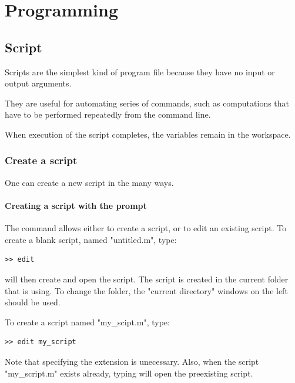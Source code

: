 \chapter{Programming}
\label{chap-code}

\section{Script}\label{sec-script}
	Scripts are the simplest kind of program file because they have no input or output arguments. 

	They are useful for automating series of \matlab commands, such as computations that have to be performed repeatedly from the command line.


	When execution of the script completes, the variables remain in the \matlab workspace. 



	\subsection{Create a script}
		One can create a new script in the many ways.
		
		\subsubsection{Creating a script with the prompt}
			The  command allows either to create a script, or to edit an existing script.
			To create a blank script, named "untitled.m", type:
\begin{lstlisting}
>> edit
\end{lstlisting}
			\matlab will then create and open the script.
			The script is created in the current folder that \matlab is using. 
			To change the folder, the "current directory" windows on the left should be used.
		
			To create a script named "my\_scipt.m", type:
\begin{lstlisting}
>> edit my_script
\end{lstlisting}
			Note that specifying the extension is unecessary.
			Also, when the script "my\_script.m" exists already, typing  will open the preexisting script.		
